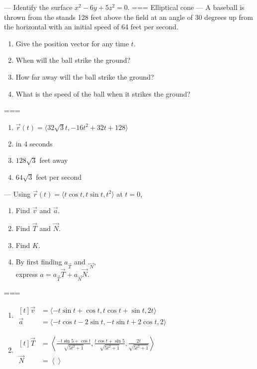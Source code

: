 ---
Identify the surface \(x^2-6y+5z^2=0\).
===
Elliptical cone
---
A baseball is thrown from the stands 128 feet above the field at an angle of
30 degrees up from the horizontal with an initial speed of 64 feet per second.
\begin{enumerate}[label=\alph*.]
  \item Give the position vector for any time \(t\).
  \item When will the ball strike the ground?
  \item How far away will the ball strike the ground?
  \item What is the speed of the ball when it strikes the ground?
\end{enumerate}
===
\begin{enumerate}[label=\alph*.]
  \item \(\vec r(t)=\langle 32\sqrt 3t,-16t^2+32t+128\rangle\)
  \item in 4 seconds
  \item \(128\sqrt 3\) feet away
  \item \(64\sqrt 3\) feet per second
\end{enumerate}
---
Using \(\vec r(t)=\langle t\cos t,t\sin t,t^2\rangle\) at \(t=0\),
\begin{enumerate}[label=\alph*.]
  \item Find \(\vec v\) and \(\vec a\).
  \item Find \(\vec T\) and \(\vec N\).
  \item Find \(K\).
  \item By first finding \(a_{\vec T}\) and \(._{\vec N}\),\\
    express \(a=a_{\vec T}\vec T+a_{\vec N}\vec N\).
\end{enumerate}
===
\begin{enumerate}[label=\alph*.]
  \item
    \(\begin{aligned}[t]
      \vec v&=\langle-t\sin t+\cos t,t\cos t+\sin t,2t\rangle \\
      \vec a&=\langle-t\cos t-2\sin t,-t\sin t+2\cos t,2\rangle
    \end{aligned}\)
  \item \(
    \displaystyle \begin{aligned}[t]
      \vec T&=\left\langle
        \frac{-t\sin 5+\cos t}{\sqrt{5t^2+1}},
        \frac{t\cos t+\sin 5}{\sqrt{5t^2+1}},
        \frac{2t}{\sqrt{5t^2+1}}\right\rangle\\
      \vec N&=\left\langle\right\rangle
    \end{aligned}\)
\end{enumerate}
